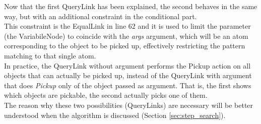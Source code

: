 Now that the first QueryLink has been explained, the second behaves in the same way, but with an additional constraint in the conditional part. \\
This constraint is the EqualLink in line 62 and it is used to limit the parameter (the VariabileNode) to coincide with the \textit{args} argument, which will be an atom corresponding to the object to be picked up, effectively restricting the pattern matching to that single atom. \\
In practice, the QueryLink without argument performs the Pickup action on all objects that can actually be picked up, instead of the QueryLink with argument that does \textit{Pickup} only of the object passed as argument. That is, the first shows which objects are pickable, the second actually picks one of them. \\
The reason why these two possibilities (QueryLinks) are necessary will be better understood when the algorithm is discussed (Section \ref{sec:step_search}). 

 
